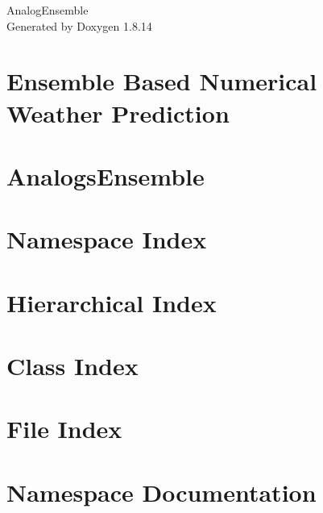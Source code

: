 \documentclass[twoside]{book}
\newcommand{\+}{\discretionary{\mbox{\scriptsize$\hookleftarrow$}}{}{}}
\newcommand{\clearemptydoublepage}{%
  \newpage{\pagestyle{empty}\cleardoublepage}%
}
\begin{document}
\hypersetup{pageanchor=false,
             bookmarksnumbered=true,
             pdfencoding=unicode
            }
\begin{titlepage}
\vspace*{7cm}
\begin{center}%
{\Large Analog\+Ensemble }\\
\vspace*{1cm}
{\large Generated by Doxygen 1.8.14}\\
\end{center}
\end{titlepage}
\clearemptydoublepage
{}
\tableofcontents
\clearemptydoublepage
{}
\hypersetup{pageanchor=true}

\chapter{Ensemble Based Numerical Weather Prediction}
\label{index}\hypertarget{index}{}
\chapter{Analogs\+Ensemble}
\label{md__r_e_a_d_m_e}

\chapter{Namespace Index}

\chapter{Hierarchical Index}

\chapter{Class Index}

\chapter{File Index}

\chapter{Namespace Documentation}






\end{document}
